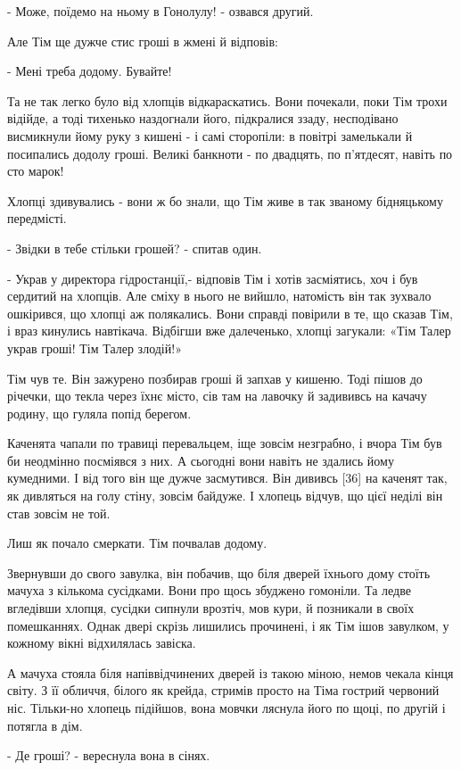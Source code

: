 - Може, поїдемо на ньому в Гонолулу! - озвався другий.

Але Тім ще дужче стис гроші в жмені й відповів:

- Мені треба додому. Бувайте!

Та не так легко було від хлопців відкараскатись. Вони почекали, поки Тім трохи відійде, а тоді тихенько наздогнали його, підкралися ззаду, несподівано висмикнули йому руку з кишені - і самі сторопіли: в повітрі замелькали й посипались додолу гроші. Великі банкноти - по двадцять, по п'ятдесят, навіть по сто марок!

Хлопці здивувались - вони ж бо знали, що Тім живе в так званому бідняцькому передмісті.

- Звідки в тебе стільки грошей? - спитав один.

- Украв у директора гідростанції,- відповів Тім і хотів засміятись, хоч і був сердитий на хлопців. Але сміху в нього не вийшло, натомість він так зухвало ошкірився, що хлопці аж полякались. Вони справді повірили в те, що сказав Тім, і враз кинулись навтікача. Відбігши вже далеченько, хлопці загукали: «Тім Талер украв гроші! Тім Талер злодій!»

Тім чув те. Він зажурено позбирав гроші й запхав у кишеню. Тоді пішов до річечки, що текла через їхнє місто, сів там на лавочку й задививсь на качачу родину, що гуляла попід берегом.

Каченята чапали по травиці перевальцем, іще зовсім незграбно, і вчора Тім був би неодмінно посміявся з них. А сьогодні вони навіть не здались йому кумедними. І від того він ще дужче засмутився. Він дививсь [36] на каченят так, як дивляться на голу стіну, зовсім байдуже. І хлопець відчув, що цієї неділі він став зовсім не той.

Лиш як почало смеркати. Тім почвалав додому.

Звернувши до свого завулка, він побачив, що біля дверей їхнього дому стоїть мачуха з кількома сусідками. Вони про щось збуджено гомоніли. Та ледве вгледівши хлопця, сусідки сипнули врозтіч, мов кури, й позникали в своїх помешканнях. Однак двері скрізь лишились прочинені, і як Тім ішов завулком, у кожному вікні відхилялась завіска.

А мачуха стояла біля напіввідчинених дверей із такою міною, немов чекала кінця світу. З її обличчя, білого як крейда, стримів просто на Тіма гострий червоний ніс. Тільки-но хлопець підійшов, вона мовчки ляснула його по щоці, по другій і потягла в дім.

- Де гроші? - вереснула вона в сінях.


